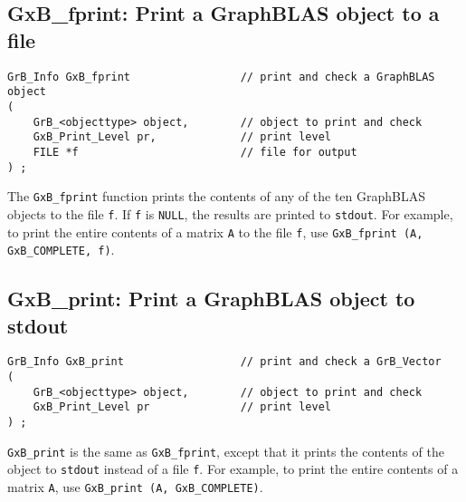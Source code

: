 \documentclass[12pt]{article}
\begin{document}
\newpage
\subsection{{\sf GxB\_fprint:} Print a GraphBLAS object to a file} %

\begin{mdframed}[userdefinedwidth=6in]
{\footnotesize
\begin{verbatim}
GrB_Info GxB_fprint                 // print and check a GraphBLAS object
(
    GrB_<objecttype> object,        // object to print and check
    GxB_Print_Level pr,             // print level
    FILE *f                         // file for output
) ;
\end{verbatim} } \end{mdframed}

The \verb'GxB_fprint' function prints the contents of any of the ten GraphBLAS
objects to the file \verb'f'.  If \verb'f' is \verb'NULL', the results are
printed to \verb'stdout'.  For example, to print the entire contents of a
matrix \verb'A' to the file \verb'f', use
\verb'GxB_fprint (A, GxB_COMPLETE, f)'.

\subsection{{\sf GxB\_print:} Print a GraphBLAS object to {\sf stdout}} %
\label{gxb_print}

\begin{mdframed}[userdefinedwidth=6in]
{\footnotesize
\begin{verbatim}
GrB_Info GxB_print                  // print and check a GrB_Vector
(
    GrB_<objecttype> object,        // object to print and check
    GxB_Print_Level pr              // print level
) ;
\end{verbatim} } \end{mdframed}

\verb'GxB_print' is the same as \verb'GxB_fprint', except that it prints the
contents of the object to \verb'stdout' instead of a file \verb'f'.  For
example, to print the entire contents of a matrix \verb'A',  use
\verb'GxB_print (A, GxB_COMPLETE)'.
\end{document}
